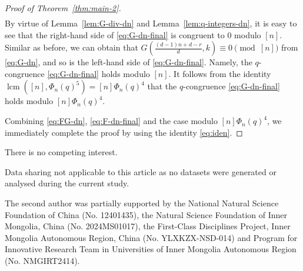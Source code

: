 \documentclass[12pt]{article}
\numberwithin{equation}{section}
\begin{document}
\begin{proof}[Proof of Theorem~\ref{thm:main-2}]
\begin{align}
\end{align}
By virtue of Lemma~\ref{lem:G-div-dn} and Lemma~\ref{lem:q-integers-dn}, it is easy to see that the right-hand side 
of \eqref{eq:G-dn-final} is congruent to 0 modulo $[n]$. Similar as before, we can obtain that $G(\tfrac{(d-1)n+d-r}{d},k)\equiv 0\pmod{[n]}$ from 
\eqref{eq:G-dn}, and so is the left-hand side of \eqref{eq:G-dn-final}. Namely, the $q$-congruence \eqref{eq:G-dn-final} holds modulo $[n]$.
It follows from the identity $\operatorname{lcm}([n],\Phi_n(q)^5)=[n]\Phi_n(q)^4$ that the $q$-congruence \eqref{eq:G-dn-final} holds modulo $[n]\Phi_n(q)^4$.\par
Combining \eqref{eq:FG-dn}, \eqref{eq:F-dn-final} and the case modulo $[n]\Phi_n(q)^4$, we immediately complete the proof by using the identity \eqref{eq:iden}.
\end{proof}




\vskip 5mm There is no competing interest.

\vskip 5mm 
Data sharing not applicable to this article as no datasets were generated or analysed during the current study.

\vskip 5mm  The second author was partially supported by the National Natural Science Foundation of China (No. 12401435), the Natural Science
 Foundation of Inner Mongolia, China (No. 2024MS01017), the First-Class Disciplines Project, Inner Mongolia Autonomous Region, China (No. YLXKZX-NSD-014) and Program for Innovative Research Team in Universities of Inner Mongolia Autonomous Region (No. NMGIRT2414).
\end{document}
